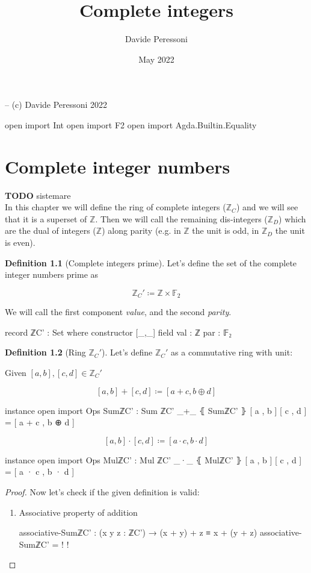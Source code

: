 \documentclass[a4paper]{report}
\title{Complete integers}
\author{Davide Peressoni}
\date{May 2022}
\theoremstyle{definition}
\newtheorem{definition}{Definition}
\newcommand\bZ{\mathbb{Z}}
\newcommand\bF{\mathbb{F}}
\begin{document}
\maketitle

\begin{code}
-- (c) Davide Peressoni 2022

open import Int
open import F2
open import Agda.Builtin.Equality
\end{code}

\chapter{Complete integer numbers}

\textbf{TODO} sistemare\\
In this chapter we will define the ring of complete integers ($\bZ_C$) and we will
see that it is a superset of $\bZ$. Then we will call the remaining dis-integers
($\bZ_D$) which are the dual of integers ($\bZ$) along parity (e.g. in $\bZ$ the unit is
odd, in $\bZ_D$ the unit is even).

\begin{definition}[Complete integers prime]
Let's define the set of the complete integer numbers prime as

\[\bZ_C' \coloneqq \bZ\times\bF_2\]

We will call the first component \emph{value}, and the second \emph{parity}.

\begin{code}
record ℤC' : Set where
  constructor [_,_]
  field
    val : ℤ
    par : 𝔽₂
\end{code}
\end{definition}

\begin{definition}[Ring $\bZ_C'$]
Let's define $\bZ_C'$ as a commutative ring with unit:

Given $[a,b], [c,d] \in \bZ_C'$

\[[a,b] + [c,d] \coloneqq [a+c, b\oplus d]\]

\begin{code}
instance
  open import Ops
  SumℤC' : Sum ℤC'
  _+_ ⦃ SumℤC' ⦄ [ a , b ] [ c , d ] = [ a + c , b ⊕ d ]
\end{code}

\[[a,b] \cdot [c,d] \coloneqq [a\cdot c, b\cdot d]\]

\begin{code}
instance
  open import Ops
  MulℤC' : Mul ℤC'
  _·_ ⦃ MulℤC' ⦄ [ a , b ] [ c , d ] = [ a · c , b · d ]
\end{code}
\end{definition}

\begin{proof}
  Now let's check if the given definition is valid:
  \begin{enumerate}
    \item Associative property of addition
      \begin{code}
associative-SumℤC' : (x y z : ℤC') → (x + y) + z ≡ x + (y + z)
associative-SumℤC' = {!   !}
      \end{code}
  \end{enumerate}
\end{proof}
\end{document}
